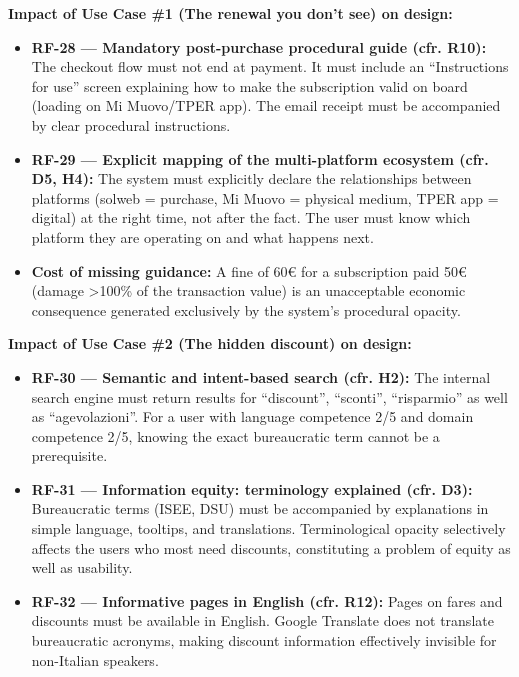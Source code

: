 ﻿\documentclass[11pt,a4paper]{article}
\begin{document}
\vspace{0.3cm}

\begin{tcolorbox}[base]
    {\small
    \textbf{Impact of Use Case \#1 (The renewal you don't see) on design:} \\[4pt]
    \begin{itemize}[leftmargin=*]
        \item \textbf{RF-28 --- Mandatory post-purchase procedural guide (cfr. R10):} The checkout flow must not end at payment. It must include an ``Instructions for use'' screen explaining how to make the subscription valid on board (loading on Mi Muovo/TPER app). The email receipt must be accompanied by clear procedural instructions.

        \item \textbf{RF-29 --- Explicit mapping of the multi-platform ecosystem (cfr. D5, H4):} The system must explicitly declare the relationships between platforms (solweb = purchase, Mi Muovo = physical medium, TPER app = digital) at the right time, not after the fact. The user must know which platform they are operating on and what happens next.

        \item \textbf{Cost of missing guidance:} A fine of 60\euro{} for a subscription paid 50\euro{} (damage >100\% of the transaction value) is an unacceptable economic consequence generated exclusively by the system's procedural opacity.
    \end{itemize}
    \vspace{0.2cm}
    \textbf{Impact of Use Case \#2 (The hidden discount) on design:} \\[4pt]
    \begin{itemize}[leftmargin=*]
        \item \textbf{RF-30 --- Semantic and intent-based search (cfr. H2):} The internal search engine must return results for ``discount'', ``sconti'', ``risparmio'' as well as ``agevolazioni''. For a user with language competence 2/5 and domain competence 2/5, knowing the exact bureaucratic term cannot be a prerequisite.

        \item \textbf{RF-31 --- Information equity: terminology explained (cfr. D3):} Bureaucratic terms (ISEE, DSU) must be accompanied by explanations in simple language, tooltips, and translations. Terminological opacity selectively affects the users who most need discounts, constituting a problem of equity as well as usability.

        \item \textbf{RF-32 --- Informative pages in English (cfr. R12):} Pages on fares and discounts must be available in English. Google Translate does not translate bureaucratic acronyms, making discount information effectively invisible for non-Italian speakers.
    \end{itemize}
    }
\end{tcolorbox}
\end{document}

